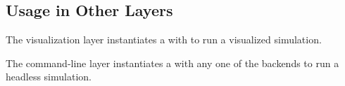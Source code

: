 



\subsection{Usage in Other Layers}
The visualization layer instantiates a  with  to run a visualized simulation.

The command-line layer instantiates a  with any one of the backends to run a headless simulation.